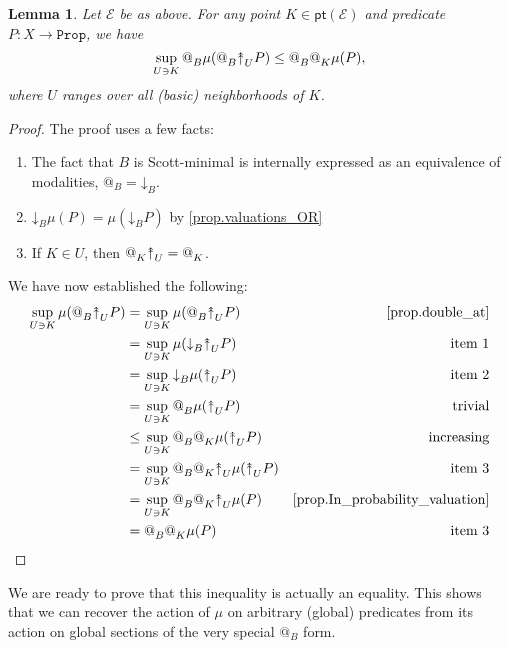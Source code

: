 \documentclass[11pt, oneside, article]{memoir}
\makeatletter
\theoremstyle{plain}
\newtheorem{lemma}[theorem]{Lemma}
\theoremstyle{definition}
\theoremstyle{remark}
\newcommand{\const}[1]{\mathtt{#1}}
\newcommand{\cat}[1]{\mathcal{#1}}
\newcommand{\Fun}[1]{\mathsf{#1}}
\newcommand{\Prop}{\const{Prop}}
\newcommand{\pt}{\Fun{pt}}
\newcommand{\BaseSpace}{B}
\newcommand{\AtSymbol}{{@}}
\newcommand{\SeeSymbol}{{\down}}  %
\newcommand{\InSymbol}{{\upclose}}%
\newcommand{\At}[2][]{\AtSymbol^{#1}_{#2}}
\newcommand{\See}[2][]{\SeeSymbol^{#1}_{#2}}
\newcommand{\In}[2][]{\InSymbol^{#1}_{#2}}
\newcommand{\upclose}{{\rotatebox[origin=c]{90}{$\twoheadrightarrow$}}}
\newcommand{\down}{\mathord{\downarrow}}
\makeatother
\begin{document}
\begin{lemma}\label{lemma.inequality_rand9865}
Let $\cat{E}$ be as above. For any point $K\in\pt(\cat{E})$ and predicate $P\colon X\to \Prop$, we have
\[
\sup_{U\ni K} \At{\BaseSpace} \mu(\At{\BaseSpace}\In{U}P) \leq \At{\BaseSpace} \At{K} \mu(P),
\]
where $U$ ranges over all (basic) neighborhoods of $K$.
\end{lemma}
\begin{proof}
The proof uses a few facts:
\begin{enumerate}
	\item The fact that $\BaseSpace$ is Scott-minimal is internally expressed as an equivalence of modalities, $\At{\BaseSpace}=\See{\BaseSpace}$.
	\item $\See{\BaseSpace}\mu(P)=\mu(\See{\BaseSpace}P)$ by \cref{prop.valuations_OR}
	\item If $K\in U$, then $\At{K}\In{U} = \At{K}$.
\end{enumerate}
We have now established the following:
\begin{align}
\nonumber
	\sup_{U\ni K}\mu(\At{\BaseSpace}\In{U}P)
	&=\sup_{U\ni K}\mu(\At{\BaseSpace}\In{U}P)&\text{\cref{prop.double_at}} \\\nonumber
	&=\sup_{U\ni K}\mu(\See{\BaseSpace}\In{U}P)&\text{item 1}\\\nonumber
	&=\sup_{U\ni K}\See{\BaseSpace}\mu(\In{U}P)&\text{item 2}\\\nonumber
	&=\sup_{U\ni K}\At{\BaseSpace}\mu(\In{U}P)&\text{trivial}\\\nonumber
	&\leq\sup_{U\ni K}\At{\BaseSpace}\At{K}\mu(\In{U}P)&\text{increasing}\\\nonumber
	&=\sup_{U\ni K}\At{\BaseSpace}\At{K}\In{U}\mu(\In{U}P)&\text{item 3}\\\nonumber
	&=\sup_{U\ni K}\At{\BaseSpace}\At{K}\In{U}\mu(P)&\text{\cref{prop.In_probability_valuation}}\\\nonumber
	&=\At{\BaseSpace}\At{K}\mu(P)&\text{item 3}
\end{align}
\end{proof}


We are ready to prove that this inequality is actually an equality. This shows that we can recover the action of $\mu$ on arbitrary (global) predicates from its action on global sections of the very special $\At{B}$ form.
\end{document}
